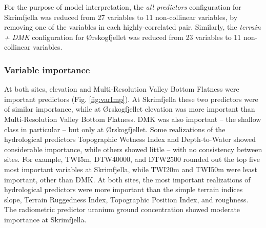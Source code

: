 \documentclass[soil, manuscript]{copernicus}
\begin{document}
For the purpose of model interpretation, the \emph{all predictors} configuration for Skrimfjella was reduced from 27 variables to 11 non-collinear variables, by removing one of the variables in each highly-correlated pair.
Similarly, the \emph{terrain + DMK} configuration for Ørskogfjellet was reduced from 23 variables to 11 non-collinear variables.

\subsubsection{Variable importance}

At both sites, elevation and Multi-Resolution Valley Bottom Flatness were important predictors (Fig. \ref{fig:varImp}).
At Skrimfjella these two predictors were of similar importance, while at Ørskogfjellet elevation was more important than Multi-Resolution Valley Bottom Flatness.
DMK was also important -- the shallow class in particular -- but only at Ørskogfjellet.
Some realizations of the hydrological predictors Topographic Wetness Index and Depth-to-Water showed considerable importance, while others showed little -- with no consistency between sites.
For example, TWI5m, DTW40000, and DTW2500 rounded out the top five most important variables at Skrimfjella, while TWI20m and TWI50m were least important, other than DMK.
At both sites, the most important realizations of hydrological predictors were more important than the simple terrain indices slope, Terrain Ruggedness Index, Topographic Position Index, and roughness.
The radiometric predictor uranium ground concentration showed moderate importance at Skrimfjella.
\end{document}
